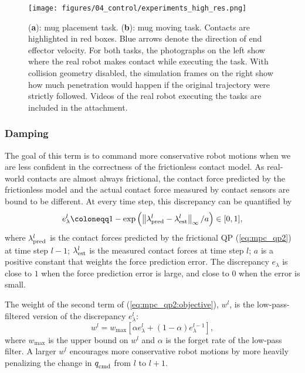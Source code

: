 \begin{figure}[t!]
\vspace{0.2cm}
\centering
\texttt{[image: figures/04\_control/experiments\_high\_res.png]}
\caption{(\textbf{a}): mug placement task. (\textbf{b}): mug moving task. Contacts are highlighted in red boxes. Blue arrows denote the direction of end effector velocity. For both tasks, the photographs on the left show where the real robot makes contact while executing the task. With collision geometry disabled, the simulation frames on the right show how much penetration would happen if the original trajectory were strictly followed. Videos of the real robot executing the tasks are included in the attachment.}
\label{fig:experiments}
\vspace{-0.6cm}
\end{figure}


\subsubsection{Damping} 
The goal of this term is to command more conservative robot motions when we are less confident in the correctness of the frictionless contact model. As real-world contacts are almost always frictional, the contact force predicted by the frictionless model and the actual contact force measured by contact sensors are bound to be different. At every time step, this discrepancy can be quantified by
\begin{equation}
e_\lambda^l \coloneqq 1 - \exp{\left(\left\|\lambda_{\rm pred}^l -\lambda_{\rm est}^l \right\|_{\infty}/a\right)} \in [0, 1],
\end{equation}
where $\lambda_{\rm pred}^l$ is the contact forces predicted by the frictional QP (\ref{eq:mpc_qp2}) at time step $l - 1$; $\lambda_{\rm est}^l$ is the measured contact forces at time step $l$; $a$ is a positive constant that weights the force prediction error. The discrepancy $e_\lambda$ is close to $1$ when the force prediction error is large, and close to $0$ when the error is small.

The weight of the second term of (\ref{eq:mpc_qp2:objective}), $w^l$, is the low-pass-filtered version of the discrepancy $e_\lambda^l$:
\begin{equation}
w^l = w_\text{max} \left[ \alpha e_\lambda^l + (1 - \alpha) e_\lambda^{l-1} \right],
\end{equation}
where $w_\text{max}$ is the upper bound on $w^l$ and $\alpha$ is the forget rate of the low-pass filter. A larger $w^l$ encourages more conservative robot motions by more heavily penalizing the change in $q_{\text{cmd}}^{}$ from $l$ to $l+1$.



